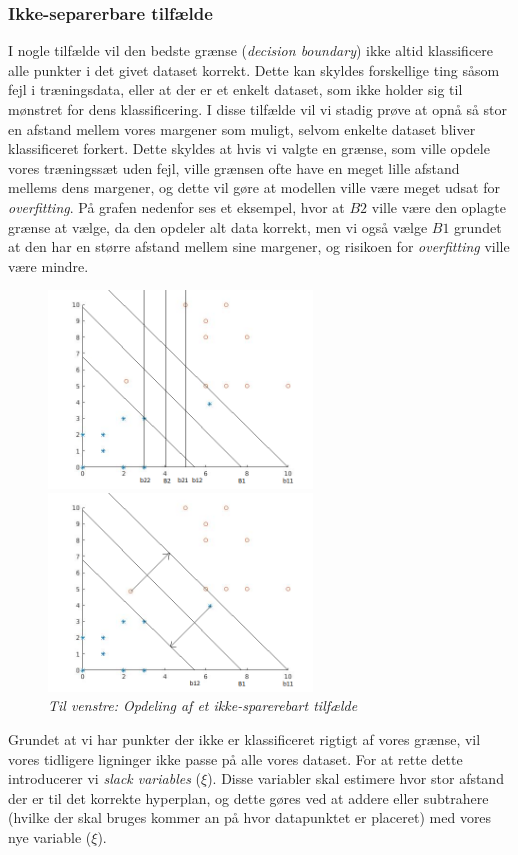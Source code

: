 \documentclass{article}
\begin{document}
\subsubsection{Ikke-separerbare tilfælde}
I nogle tilfælde vil den bedste grænse (\textit{decision boundary}) ikke altid klassificere alle punkter i det givet dataset korrekt. Dette kan skyldes forskellige ting såsom fejl i træningsdata, eller at der er et enkelt dataset, som ikke holder sig til mønstret for dens klassificering. I disse tilfælde vil vi stadig prøve at opnå så stor en afstand mellem vores margener som muligt, selvom enkelte dataset bliver klassificeret forkert. Dette skyldes at hvis vi valgte en grænse, som ville opdele vores træningssæt uden fejl, ville grænsen ofte have en meget lille afstand mellems dens margener, og dette vil gøre at modellen ville være meget udsat for \textit{overfitting}. På grafen nedenfor ses et eksempel, hvor at $B2$ ville være den oplagte grænse at vælge, da den opdeler alt data korrekt, men vi også vælge $B1$ grundet at den har en større afstand mellem sine margener, og risikoen for \textit{overfitting} ville være mindre. 
\begin{figure}[H]
	\begin{minipage}[t]{0.6\linewidth}
		\includegraphics[width=7cm]{svm_plot_1}
	\end{minipage}
	\begin{minipage}[t]{0.1\linewidth}
		\includegraphics[width=7cm]{svm_plot_1_2}
	\end{minipage}
\caption{\textit{Til venstre: Opdeling af et ikke-sparerebart tilfælde}}
\label{fig:hyperplane_example_1}
\end{figure}
Grundet at vi har punkter der ikke er klassificeret rigtigt af vores grænse, vil vores tidligere ligninger ikke passe på alle vores dataset. For at rette dette introducerer vi \textit{slack variables} ($\xi$). Disse variabler skal estimere hvor stor afstand der er til det korrekte hyperplan, og dette gøres ved at addere eller subtrahere (hvilke der skal bruges kommer an på hvor datapunktet er placeret) med vores nye variable ($\xi$). 
\end{document}
